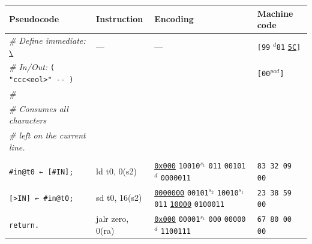 \documentclass[a4paper,12pt,final]{article}
\begin{document}
\begin{table}[!htbp] \begin{adjustwidth}{-1cm}{-1cm} \fontsize{8}{9.600000}\selectfont
\begin{center}
\begin{tabular}{l|ll|l}
\textbf{Pseudocode} & \textbf{Instruction} & \textbf{Encoding} & \textbf{Machine code}\\[0pt]
\hline
\emph{\# Define immediate:} \uline{\texttt{\textbackslash{}}} & --- & --- & \texttt{[99} \(^{d}\)​\texttt{81} \uline{\texttt{5C}}​\texttt{]}\\[0pt]
\emph{\# In/Out:} \texttt{( "ccc<eol>" -​- )} &  &  & \texttt{[00}​\(^{pad}\)​\texttt{]}\\[0pt]
\emph{\#} &  &  & \\[0pt]
\emph{\# Consumes all characters} &  &  & \\[0pt]
\emph{\# left on the current line.} &  &  & \\[0pt]
 &  &  & \\[0pt]
\texttt{\#in@t0 ← [\#IN];} & ld t0, 0(s2) & \uline{\texttt{0x000}}                    \texttt{10010}​\(^{s_{1}}\) \texttt{011} \texttt{00101}​\(^{d}\)  \texttt{0000011} & \texttt{83 32 09 00}\\[0pt]
\texttt{[>IN] ← \#in@t0;} & sd t0, 16(s2) & \uline{\texttt{0000000}} \texttt{00101}​\(^{s_{2}}\) \texttt{10010}​\(^{s_{1}}\) \texttt{011} \uline{\texttt{10000}} \texttt{0100011} & \texttt{23 38 59 00}\\[0pt]
\texttt{return.} & jalr zero, 0(ra) & \uline{\texttt{0x000}}                    \texttt{00001}​\(^{s_{1}}\) \texttt{000} \texttt{00000}​\(^{d}\)  \texttt{1100111} & \texttt{67 80 00 00}\\[0pt]
\end{tabular}

\end{center}
\normalsize \end{adjustwidth} \end{table} \vspace{0}
\end{document}
